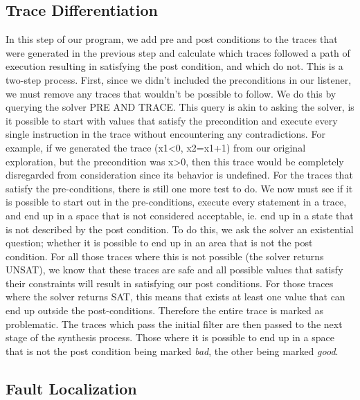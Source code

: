 \documentclass[]{article}
\begin{document}
\subsection{Trace Differentiation}
In this step of our program, we add pre and post conditions to the traces
that were generated in the previous step and calculate which traces followed
a path of execution resulting in satisfying the post condition, and which do
not.  This is a two-step process.  First, since we didn't included the
preconditions in our listener, we must remove any traces that wouldn't be
possible to follow.  We do this by querying the solver PRE AND TRACE.  This
query is akin to asking the solver, is it possible to start with values that
satisfy the precondition and execute every single instruction in the trace
without encountering any contradictions.  For example, if we generated the
trace (x1<0, x2=x1+1) from our original exploration, but the precondition
was x>0, then this trace would be completely disregarded from consideration
since its behavior is undefined.  For the traces that satisfy the
pre-conditions, there is still one more test to do.  We now must see if it
is possible to start out in the pre-conditions, execute every statement in a
trace, and end up in a space that is not considered acceptable, ie. end up
in a state that is not described by the post condition.  To do this, we ask
the solver an existential question; whether it is possible to end up in an
area that is not the post condition.  For all those traces where this is not
possible (the solver returns UNSAT), we know that these traces are safe and
all possible values that satisfy their constraints will result in satisfying
our post conditions.  For those traces where the solver returns SAT, this
means that exists at least one value that can end up outside the
post-conditions.  Therefore the entire trace is marked as problematic.  The
traces which pass the initial filter are then passed to the next stage of
the synthesis process.  Those where it is possible to end up in a space that
is not the post condition being marked \emph{bad}, the other being marked
\emph{good}.

\subsection{Fault Localization}
\end{document}
